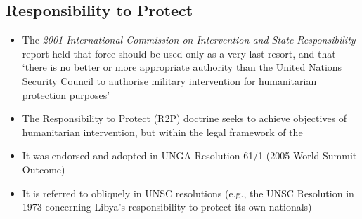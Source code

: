 \subsection{Responsibility to Protect}
\begin{itemize}
    \item The \textit{2001 International Commission on Intervention and State Responsibility} report held that force should be used only as a very last resort, and that `there is no better or more appropriate authority than the United Nations Security Council to authorise military intervention for humanitarian protection purposes'
    \item The Responsibility to Protect (R2P) doctrine seeks to achieve objectives of humanitarian intervention, but within the legal framework of the 
    \item It was endorsed and adopted in UNGA Resolution 61/1 (2005 World Summit Outcome)
    \item It is referred to obliquely in UNSC resolutions (e.g., the UNSC Resolution in 1973 concerning Libya's responsibility to protect its own nationals)
\end{itemize}